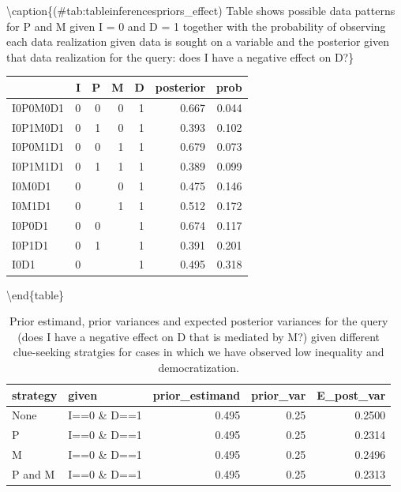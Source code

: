 \documentclass[
  12pt,
]{book}
\begin{document}
\textbackslash caption\{(\#tab:tableinferencespriors\_effect)\label{possible_outcomespimd_priors_effect} Table shows possible data patterns for P and M given I = 0 and D = 1 together with the probability of observing each data realization given data is sought on a variable and the posterior given that data realization for the query: does I have a negative effect on D?\}
\centering

\begin{tabular}[t]{l|r|r|r|r|r|r}
\hline
  & I & P & M & D & posterior & prob\\
\hline
I0P0M0D1 & 0 & 0 & 0 & 1 & 0.667 & 0.044\\
\hline
I0P1M0D1 & 0 & 1 & 0 & 1 & 0.393 & 0.102\\
\hline
I0P0M1D1 & 0 & 0 & 1 & 1 & 0.679 & 0.073\\
\hline
I0P1M1D1 & 0 & 1 & 1 & 1 & 0.389 & 0.099\\
\hline
I0M0D1 & 0 &  & 0 & 1 & 0.475 & 0.146\\
\hline
I0M1D1 & 0 &  & 1 & 1 & 0.512 & 0.172\\
\hline
I0P0D1 & 0 & 0 &  & 1 & 0.674 & 0.117\\
\hline
I0P1D1 & 0 & 1 &  & 1 & 0.391 & 0.201\\
\hline
I0D1 & 0 &  &  & 1 & 0.495 & 0.318\\
\hline
\end{tabular}

\textbackslash end\{table\}

\begin{table}

\caption{\label{tab:pimdlearnpriorseffect}Prior estimand, prior variances and expected posterior variances for the query (does I have a negative effect on D that is mediated by M?) given different  clue-seeking  stratgies for cases in which we have observed low inequality and democratization.}
\centering
\begin{tabular}[t]{l|l|r|r|r}
\hline
strategy & given & prior\_estimand & prior\_var & E\_post\_var\\
\hline
None & I==0 \& D==1 & 0.495 & 0.25 & 0.2500\\
\hline
P & I==0 \& D==1 & 0.495 & 0.25 & 0.2314\\
\hline
M & I==0 \& D==1 & 0.495 & 0.25 & 0.2496\\
\hline
P and M & I==0 \& D==1 & 0.495 & 0.25 & 0.2313\\
\hline
\end{tabular}
\end{table}
\end{document}
